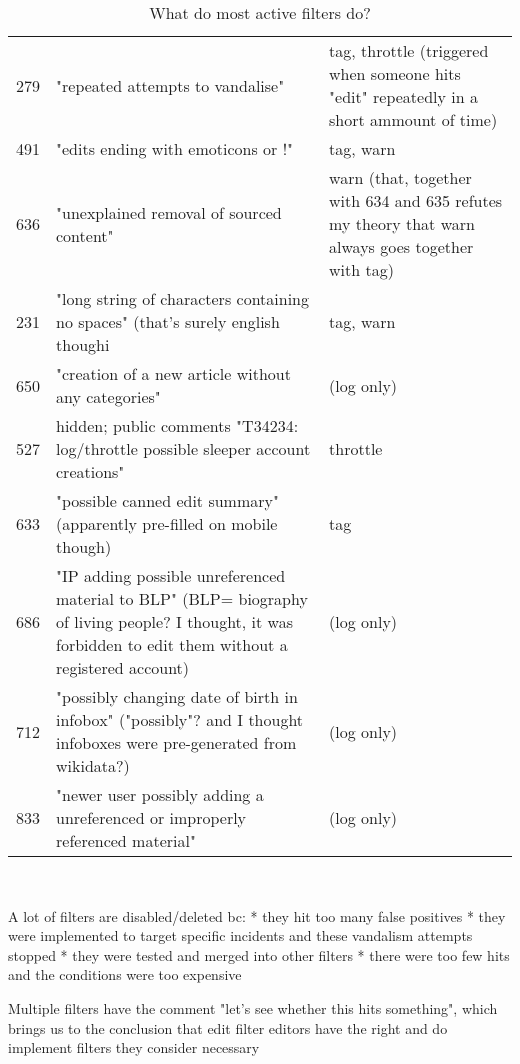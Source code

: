 \begin{table*}
\begin{tabular}{r p{10cm} p{5cm} }
      279 & "repeated attempts to vandalise" & tag, throttle (triggered when someone hits "edit" repeatedly in a short ammount of time) \\
      491 & "edits ending with emoticons or !" & tag, warn \\
      636 & "unexplained removal of sourced content" & warn (that, together with 634 and 635 refutes my theory that warn always goes together with tag) \\
      231 & "long string of characters containing no spaces" (that's surely english though^^) & tag, warn \\
      650 & "creation of a new article without any categories" & (log only) \\
      527 & hidden; public comments "T34234: log/throttle possible sleeper account creations" & throttle \\
      633 & "possible canned edit summary" (apparently pre-filled on mobile though) & tag \\
      686 & "IP adding possible unreferenced material to BLP" (BLP= biography of living people? I thought, it was forbidden to edit them without a registered account) & (log only) \\
      712 & "possibly changing date of birth in infobox" ("possibly"? and I thought infoboxes were pre-generated from wikidata?) & (log only) \\
      833 & "newer user possibly adding a unreferenced or improperly referenced material" & (log only) \\
  \end{tabular}
  \caption{What do most active filters do?}~\label{tab:most-active-actions}
\end{table*}

A lot of filters are disabled/deleted bc:
* they hit too many false positives
* they were implemented to target specific incidents and these vandalism attempts stopped
* they were tested and merged into other filters
* there were too few hits and the conditions were too expensive

Multiple filters have the comment "let's see whether this hits something", which brings us to the conclusion that edit filter editors have the right and do implement filters they consider necessary



